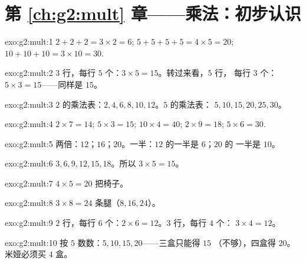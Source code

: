 \section*{第 \ref{ch:g2:mult} 章——乘法：初步认识}

\begin{solution}{exo:g2:mult:1}
$2 + 2 + 2 = 3 \times 2 = 6$; \quad
$5 + 5 + 5 + 5 = 4 \times 5 = 20$; \quad
$10 + 10 + 10 = 3 \times 10 = 30$.
\end{solution}

\begin{solution}{exo:g2:mult:2}
$3$ 行，每行 $5$ 个：$3 \times 5 = 15$。转过来看，$5$ 行，
每行 $3$ 个：$5 \times 3 = 15$——同样是 $15$。
\end{solution}

\begin{solution}{exo:g2:mult:3}
$2$ 的乘法表：$2, 4, 6, 8, 10, 12$。$5$ 的乘法表：
$5, 10, 15, 20, 25, 30$。
\end{solution}

\begin{solution}{exo:g2:mult:4}
$2 \times 7 = 14$; \quad $5 \times 3 = 15$; \quad
$10 \times 4 = 40$; \quad $2 \times 9 = 18$; \quad
$5 \times 6 = 30$.
\end{solution}

\begin{solution}{exo:g2:mult:5}
两倍：$12$；$16$；$20$。一半：$12$ 的一半是 $6$；$20$ 的
一半是 $10$。
\end{solution}

\begin{solution}{exo:g2:mult:6}
$3, 6, 9, 12, 15, 18$。所以 $3 \times 5 = 15$。
\end{solution}

\begin{solution}{exo:g2:mult:7}
$4 \times 5 = 20$ 把椅子。
\end{solution}

\begin{solution}{exo:g2:mult:8}
$3 \times 8 = 24$ 条腿（$8, 16, 24$）。
\end{solution}

\begin{solution}{exo:g2:mult:9}
$2$ 行，每行 $6$ 个：$2 \times 6 = 12$。$3$ 行，每行 $4$ 个：
$3 \times 4 = 12$。
\end{solution}

\begin{solution}{exo:g2:mult:10}
按 $5$ 数数：$5, 10, 15, 20$——三盒只能得 $15$
（不够），四盒得 $20$。米娅必须买 $4$ 盒。
\end{solution}
